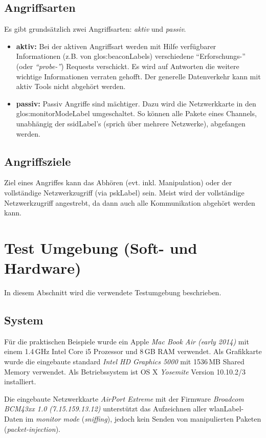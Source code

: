 \subsection{Angriffsarten}
Es gibt grundsätzlich zwei Angriffsarten: \textit{aktiv} und \textit{passiv}.
\begin{itemize}
	\item \textbf{aktiv:}
	Bei der aktiven Angriffsart werden mit Hilfe verfügbarer Informationen (z.B. von \glspl{glos:beaconLabel}) verschiedene "`Erforschungs-"' (oder \textit{"`probe-"'}) Requests verschickt.
	Es wird auf Antworten die weitere wichtige Informationen verraten gehofft.
	Der generelle Datenverkehr kann mit aktiv Tools nicht abgehört werden.

	\item \textbf{passiv:}
	Passiv Angriffe sind mächtiger. Dazu wird die Netzwerkkarte in den \gls{glos:monitorModeLabel} umgeschaltet.
	So können alle Pakete eines Channels, unabhängig der \gls{ssidLabel}'s (sprich über mehrere Netzwerke), abgefangen werden.

\end{itemize}

\subsection{Angriffsziele}
Ziel eines Angriffes kann das Abhören (evt. inkl. Manipulation) oder der vollständige Netzwerkzugriff (via \gls{pskLabel}) sein.
Meist wird der vollständige Netzwerkzugriff angestrebt, da dann auch alle Kommunikation abgehört werden kann.

\section{Test Umgebung (Soft- und Hardware)}
\label{sec:testEnvroiment}
In diesem Abschnitt wird die verwendete Testumgebung beschrieben.

\subsection{System}
Für die praktischen Beispiele wurde ein Apple \textit{Mac Book Air (early 2014)} mit einem 1.4\,GHz Intel Core i5 Prozessor und 8\,GB RAM verwendet. Als Grafikkarte wurde die eingebaute standard \textit{Intel HD Graphics 5000} mit 1536\,MB Shared Memory verwendet.
Als Betriebssystem ist OS X \textit{Yosemite} Version 10.10.2/3  installiert.

Die eingebaute Netzwerkkarte \textit{AirPort Extreme} mit der Firmware \textit{Broadcom BCM43xx 1.0 (7.15.159.13.12)} unterstützt das Aufzeichnen aller \gls{wlanLabel}-Daten im \textit{monitor mode} (\textit{sniffing}), jedoch kein Senden von manipulierten Paketen (\textit{packet-injection}).

